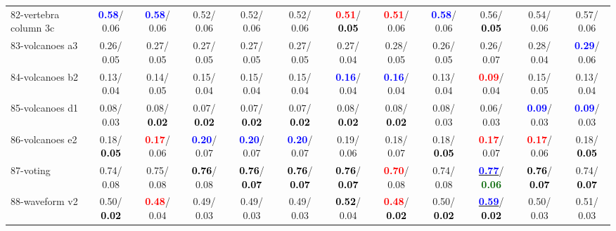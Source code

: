 \begin{table}[h]
\begin{center}
{\begin{tabular}{lc|c|c|c|c|c|c|c|c|c|c}
82-vertebra column 3c & \textcolor{blue}{\textbf{  0.58}}/  0.06 & \textcolor{blue}{\textbf{  0.58}}/  0.06 &   0.52/  0.06 &   0.52/  0.06 &   0.52/  0.06 & \textcolor{red}{\textbf{  0.51}}/\textcolor{black}{\textbf{  0.05}} & \textcolor{red}{\textbf{  0.51}}/  0.06 & \textcolor{blue}{\textbf{  0.58}}/  0.06 &   0.56/\textcolor{black}{\textbf{  0.05}} &   0.54/  0.06 &   0.57/  0.06 \\
83-volcanoes a3 &   0.26/  0.05 &   0.27/  0.05 &   0.27/  0.05 &   0.27/  0.05 &   0.27/  0.05 &   0.27/  0.04 &   0.28/  0.05 &   0.26/  0.05 &   0.26/  0.07 &   0.28/  0.04 & \textcolor{blue}{\textbf{  0.29}}/  0.06 \\
84-volcanoes b2 &   0.13/  0.04 &   0.14/  0.05 &   0.15/  0.04 &   0.15/  0.04 &   0.15/  0.04 & \textcolor{blue}{\textbf{  0.16}}/  0.04 & \textcolor{blue}{\textbf{  0.16}}/  0.04 &   0.13/  0.04 & \textcolor{red}{\textbf{  0.09}}/  0.04 &   0.15/  0.05 &   0.13/  0.04 \\
85-volcanoes d1 &   0.08/  0.03 &   0.08/\textcolor{black}{\textbf{  0.02}} &   0.07/\textcolor{black}{\textbf{  0.02}} &   0.07/\textcolor{black}{\textbf{  0.02}} &   0.07/\textcolor{black}{\textbf{  0.02}} &   0.08/\textcolor{black}{\textbf{  0.02}} &   0.08/\textcolor{black}{\textbf{  0.02}} &   0.08/  0.03 &   0.06/  0.03 & \textcolor{blue}{\textbf{  0.09}}/  0.03 & \textcolor{blue}{\textbf{  0.09}}/  0.03 \\ \hline
86-volcanoes e2 &   0.18/\textcolor{black}{\textbf{  0.05}} & \textcolor{red}{\textbf{  0.17}}/  0.06 & \textcolor{blue}{\textbf{  0.20}}/  0.07 & \textcolor{blue}{\textbf{  0.20}}/  0.07 & \textcolor{blue}{\textbf{  0.20}}/  0.07 &   0.19/  0.06 &   0.18/  0.07 &   0.18/\textcolor{black}{\textbf{  0.05}} & \textcolor{red}{\textbf{  0.17}}/  0.07 & \textcolor{red}{\textbf{  0.17}}/  0.06 &   0.18/\textcolor{black}{\textbf{  0.05}} \\
87-voting &   0.74/  0.08 &   0.75/  0.08 & \textcolor{black}{\textbf{  0.76}}/  0.08 & \textcolor{black}{\textbf{  0.76}}/\textcolor{black}{\textbf{  0.07}} & \textcolor{black}{\textbf{  0.76}}/\textcolor{black}{\textbf{  0.07}} & \textcolor{black}{\textbf{  0.76}}/\textcolor{black}{\textbf{  0.07}} & \textcolor{red}{\textbf{  0.70}}/  0.08 &   0.74/  0.08 & \underline{\textcolor{blue}{\textbf{  0.77}}}/\textcolor{darkgreen}{\textbf{  0.06}} & \textcolor{black}{\textbf{  0.76}}/\textcolor{black}{\textbf{  0.07}} &   0.74/\textcolor{black}{\textbf{  0.07}} \\
88-waveform v2 &   0.50/\textcolor{black}{\textbf{  0.02}} & \textcolor{red}{\textbf{  0.48}}/  0.04 &   0.49/  0.03 &   0.49/  0.03 &   0.49/  0.03 & \textcolor{black}{\textbf{  0.52}}/  0.04 & \textcolor{red}{\textbf{  0.48}}/\textcolor{black}{\textbf{  0.02}} &   0.50/\textcolor{black}{\textbf{  0.02}} & \underline{\textcolor{blue}{\textbf{  0.59}}}/\textcolor{black}{\textbf{  0.02}} &   0.50/  0.03 &   0.51/  0.03 \\

\end{tabular}}
\end{center}
\end{table}
